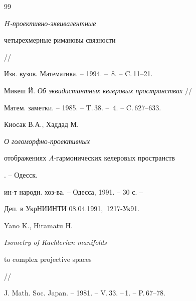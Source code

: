 \begin{thebibliography}{99}
{\em $H$-проективно-эквивалентные


четырехмерные римановы связности} //


Изв. вузов. Математика. -- 1994. -- \No\,8. -- C.\,11--21.







Микеш Й. {\em Об эквидистантных келеровых пространствах} //


Матем. заметки. -- 1985. -- T.\,38. -- \No\,4. -- C.\,627--633.





 Киосак В.А., Хаддад М.


{\em О голоморфно-проективных


отображениях $A$-гармонических келеровых пространств}. -- Одесск.


ин-т народн. хоз-ва. -- Одесса, 1991. -- 30 с. --


Деп. в УкрНИИНТИ 08.04.1991, \No\,1217-Ук91.







Yano K., Hiramatu H. {\em Isometry of Kaehlerian manifolds


to complex projective spaces} //


J. Math. Soc. Japan. -- 1981. -- V.\,33. --\No\,1. -- P.\,67--78.








\end{thebibliography}





\vskip 2cm












\label{end}








